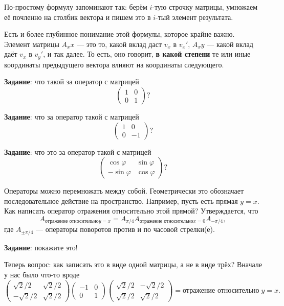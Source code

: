 \documentclass[12pt]{article}
\begin{document}
По-простому формулу запоминают так: берём $i$-тую строчку матрицы, умножаем её почленно на столбик вектора и пишем это в $i$-тый элемент результата.

Есть и более глубинное понимание этой формулы, которое крайне важно. Элемент матрицы $A_xx$ --- это то, какой вклад даст $v_x$ в $v_x'$, $A_xy$ --- какой вклад даёт $v_x$ в $v_y'$, и так далее. То есть, оно говорит, {\bf в какой степени} те или иные координаты предыдущего вектора влияют на координаты следующего.

{\bf Задание}: что такой за оператор с матрицей $$\begin{pmatrix} 1 & 0 \\ 0 & 1 \end{pmatrix}?$$

{\bf Задание}: что за оператор такой с матрицей $$\begin{pmatrix} 1 & 0 \\ 0 & -1 \end{pmatrix}?$$

{\bf Задание}: что это за оператор такой с матрицей $$\begin{pmatrix} \cos \varphi & \sin \varphi \\ -\sin\varphi & \cos \varphi \end{pmatrix}?$$

Операторы можно перемножать между собой. Геометрически это обозначает последовательное действие на пространство. Например, пусть есть прямая $y = x$. Как написать оператор отражения относительно этой прямой? Утверждается, что $$A_{\mbox{отражение относительно} y = x} = A_{\pi / 4} A_{\mbox{отражение относительно} x = 0} A_{-\pi/4},$$ где $A_{\pm \pi / 4}$ --- операторы поворотов против и по часовой стрелки(е).

{\bf Задание}: покажите это!

Теперь вопрос: как записать это в виде одной матрицы, а не в виде трёх? Вначале у нас было что-то вроде $$\begin{pmatrix} \sqrt{2} / 2 & \sqrt{2} / 2 \\ - \sqrt{2} / 2 & \sqrt{2} / 2\end{pmatrix} \begin{pmatrix} -1 & 0 \\ 0 & 1 \end{pmatrix} \begin{pmatrix} \sqrt{2} / 2 & -\sqrt{2} / 2 \\  \sqrt{2} / 2 & \sqrt{2} / 2\end{pmatrix} = \mbox{отражение относительно}\;y = x.$$
\end{document}
